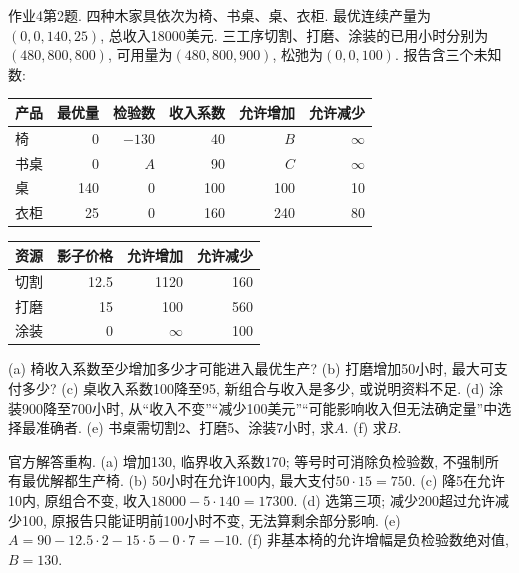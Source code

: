\begin{exercise}\label{ass:15053-ps4-q2}
作业4第2题. 四种木家具依次为椅、书桌、桌、衣柜. 最优连续产量为$(0,0,140,25)$, 总收入18000美元. 三工序切割、打磨、涂装的已用小时分别为$(480,800,800)$, 可用量为$(480,800,900)$, 松弛为$(0,0,100)$. 报告含三个未知数:
\begin{center}\begin{tabular}{lrrrrr}\toprule
产品&最优量&检验数&收入系数&允许增加&允许减少\\\midrule
椅&0&$-130$&40&$B$&$\infty$\\
书桌&0&$A$&90&$C$&$\infty$\\
桌&140&0&100&100&10\\
衣柜&25&0&160&240&80\\\bottomrule
\end{tabular}\quad
\begin{tabular}{lrrr}\toprule
资源&影子价格&允许增加&允许减少\\\midrule
切割&12.5&1120&160\\
打磨&15&100&560\\
涂装&0&$\infty$&100\\\bottomrule
\end{tabular}\end{center}
(a) 椅收入系数至少增加多少才可能进入最优生产? (b) 打磨增加50小时, 最大可支付多少? (c) 桌收入系数100降至95, 新组合与收入是多少, 或说明资料不足. (d) 涂装900降至700小时, 从“收入不变”“减少100美元”“可能影响收入但无法确定量”中选择最准确者. (e) 书桌需切割2、打磨5、涂装7小时, 求$A$. (f) 求$B$.
\end{exercise}
\begin{solution}
官方解答重构. (a) 增加130, 临界收入系数170; 等号时可消除负检验数, 不强制所有最优解都生产椅. (b) 50小时在允许100内, 最大支付$50\cdot15=750$. (c) 降5在允许10内, 原组合不变, 收入$18000-5\cdot140=17300$. (d) 选第三项; 减少200超过允许减少100, 原报告只能证明前100小时不变, 无法算剩余部分影响. (e) $A=90-12.5\cdot2-15\cdot5-0\cdot7=-10$. (f) 非基本椅的允许增幅是负检验数绝对值, $B=130$.
\end{solution}

